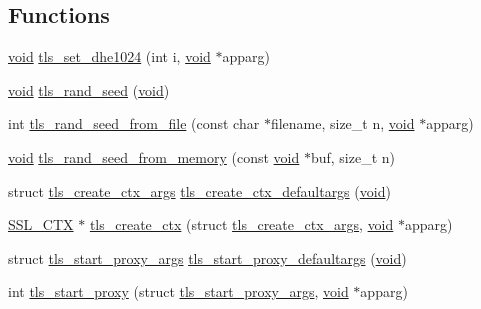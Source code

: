 \subsection*{Functions}
\begin{DoxyCompactItemize}
\item 
\hyperlink{hw__4758__cca_8h_afad4d591c7931ff6dc5bf69c76c96aa0}{void} \hyperlink{easy-tls_8h_a227ec334753c73e8b5a362ca9d292c9c}{tls\+\_\+set\+\_\+dhe1024} (int i, \hyperlink{hw__4758__cca_8h_afad4d591c7931ff6dc5bf69c76c96aa0}{void} $\ast$apparg)
\item 
\hyperlink{hw__4758__cca_8h_afad4d591c7931ff6dc5bf69c76c96aa0}{void} \hyperlink{easy-tls_8h_aeb707331a8b7efac9743f9264877d183}{tls\+\_\+rand\+\_\+seed} (\hyperlink{hw__4758__cca_8h_afad4d591c7931ff6dc5bf69c76c96aa0}{void})
\item 
int \hyperlink{easy-tls_8h_a5699d33924d03b7e0a82d576cb67886e}{tls\+\_\+rand\+\_\+seed\+\_\+from\+\_\+file} (const char $\ast$filename, size\+\_\+t n, \hyperlink{hw__4758__cca_8h_afad4d591c7931ff6dc5bf69c76c96aa0}{void} $\ast$apparg)
\item 
\hyperlink{hw__4758__cca_8h_afad4d591c7931ff6dc5bf69c76c96aa0}{void} \hyperlink{easy-tls_8h_aa7ed747619ca7216bbf249151ff27367}{tls\+\_\+rand\+\_\+seed\+\_\+from\+\_\+memory} (const \hyperlink{hw__4758__cca_8h_afad4d591c7931ff6dc5bf69c76c96aa0}{void} $\ast$buf, size\+\_\+t n)
\item 
struct \hyperlink{structtls__create__ctx__args}{tls\+\_\+create\+\_\+ctx\+\_\+args} \hyperlink{easy-tls_8h_abf8531c6b2b24bc03059e87ad0f249ea}{tls\+\_\+create\+\_\+ctx\+\_\+defaultargs} (\hyperlink{hw__4758__cca_8h_afad4d591c7931ff6dc5bf69c76c96aa0}{void})
\item 
\hyperlink{crypto_2ossl__typ_8h_a1a21892c1193ee6eb572c2c72d3924ca}{S\+S\+L\+\_\+\+C\+TX} $\ast$ \hyperlink{easy-tls_8h_ab6ab00cee3104fe6bf46684215cddb32}{tls\+\_\+create\+\_\+ctx} (struct \hyperlink{structtls__create__ctx__args}{tls\+\_\+create\+\_\+ctx\+\_\+args}, \hyperlink{hw__4758__cca_8h_afad4d591c7931ff6dc5bf69c76c96aa0}{void} $\ast$apparg)
\item 
struct \hyperlink{structtls__start__proxy__args}{tls\+\_\+start\+\_\+proxy\+\_\+args} \hyperlink{easy-tls_8h_a240c4e4bae335426120f129df49ad499}{tls\+\_\+start\+\_\+proxy\+\_\+defaultargs} (\hyperlink{hw__4758__cca_8h_afad4d591c7931ff6dc5bf69c76c96aa0}{void})
\item 
int \hyperlink{easy-tls_8h_a527af60249bf886e7a747c0033225f43}{tls\+\_\+start\+\_\+proxy} (struct \hyperlink{structtls__start__proxy__args}{tls\+\_\+start\+\_\+proxy\+\_\+args}, \hyperlink{hw__4758__cca_8h_afad4d591c7931ff6dc5bf69c76c96aa0}{void} $\ast$apparg)
\end{DoxyCompactItemize}


